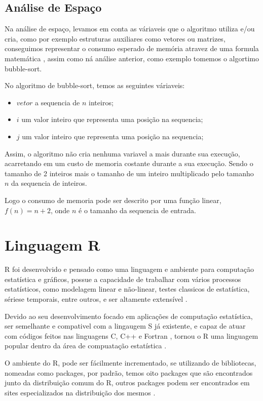 \documentclass[
	12pt,				%
	openright,			%
	oneside,			%
	a4paper,			%
	english,			%
	brazil				%
	]{abntex2}
\begin{document}
\subsection{Análise de Espaço}

Na análise de espaço, levamos em conta as váriaveis que o algoritmo utiliza e/ou cria, como por exemplo estruturas
auxiliares como vetores ou matrizes, conseguimos representar o consumo esperado de memória atravez de uma formula
matemática \cite{introductionAnalysis}, assim como ná análise anterior, como exemplo tomemos o algortimo bubble-sort.

No algoritmo de bubble-sort, temos as seguintes váriaveis:

\begin{itemize}
	\item $vetor$ a sequencia de $n$ inteiros;
	\item $i$ um valor inteiro que representa uma posição na sequencia;
	\item $j$ um valor inteiro que representa uma posição na sequencia;
\end{itemize}

Assim, o algoritmo não cria nenhuma variavel a mais durante sua execução, acarretando em um custo de memoria costante durante
a sua execução. Sendo o tamanho de 2 inteiros mais o tamanho de um inteiro multiplicado pelo tamanho $n$ da sequencia de
inteiros.

Logo o consumo de memoria pode ser descrito por uma função linear, $f(n) = n + 2$, onde $n$ é o tamanho da sequencia de
entrada.

\section{Linguagem R}

R foi desenvolvido e pensado como uma linguagem e ambiente para computação estatística e gráficos, possue a capacidade
de trabalhar com vários processos estatísticos, como modelagem linear e não-linear, testes classicos de estatística,
sériese temporais, entre outros, e ser altamente extensível \cite{ling_r}.

Devido ao seu desenvolvimento focado em aplicações de computação estatística, ser semelhante e compativel 
com a lingaugem S já existente, e capaz de atuar com códigos feitos nas linguagens C, C++ e Fortran \cite{ling_r},
tornou o R uma linguagem popular dentro da área de compuatação estatística \cite{linguagem_r}.

O ambiente do R, pode ser fácilmente incrementado, se utilizando de bibliotecas, nomeadas como packages, por padrão,
temos oito packages que são encontrados junto da distribuição comum do R, outros packages podem ser encontrados em sites
especializados na distribuição dos mesmos \cite{ling_r}.
\end{document}
